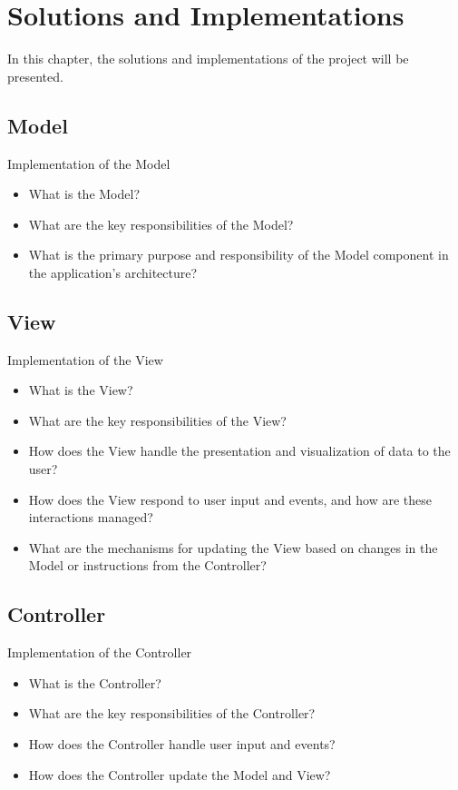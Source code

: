 \chapter{Solutions and Implementations}
In this chapter, the solutions and implementations of the project will be presented.
\section{Model}
Implementation of the Model

\begin{itemize}
	\item What is the Model?
	\item What are the key responsibilities of the Model?
	\item What is the primary purpose and responsibility of the Model component in the application's architecture?
\end{itemize}
\section{View}
Implementation of the View

\begin{itemize}
	\item What is the View?
	\item What are the key responsibilities of the View?
	\item How does the View handle the presentation and visualization of data to the user?
	\item How does the View respond to user input and events, and how are these interactions managed?
	\item What are the mechanisms for updating the View based on changes in the Model or instructions from the Controller?
\end{itemize}

\section{Controller}
Implementation of the Controller

\begin{itemize}
	\item What is the Controller?
	\item What are the key responsibilities of the Controller?
	\item How does the Controller handle user input and events?
	\item How does the Controller update the Model and View?
\end{itemize}

